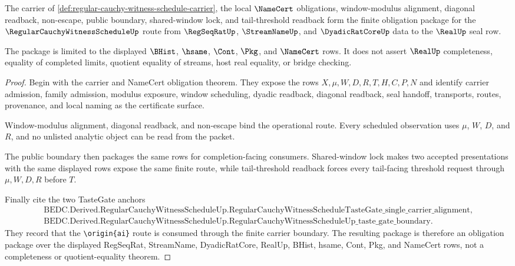 \begin{theorem}
\label{thm:regular-cauchy-witness-schedule-real-seal-readiness}
The carrier of \autoref{def:regular-cauchy-witness-schedule-carrier}, the local $\NameCert$ obligations, window-modulus alignment, diagonal readback, non-escape, public boundary, shared-window lock, and tail-threshold readback form the finite obligation package for the $\RegularCauchyWitnessScheduleUp$ route from $\RegSeqRatUp$, $\StreamNameUp$, and $\DyadicRatCoreUp$ data to the $\RealUp$ seal row.

The package is limited to the displayed $\BHist$, $\hsame$, $\Cont$, $\Pkg$, and $\NameCert$ rows. It does not assert $\RealUp$ completeness, equality of completed limits, quotient equality of streams, host real equality, or bridge checking.
\end{theorem}
\begin{proof}
Begin with the carrier and NameCert obligation theorem. They expose the rows $X,\mu,W,D,R,T,H,C,P,N$ and identify carrier admission, family admission, modulus exposure, window scheduling, dyadic readback, diagonal readback, seal handoff, transports, routes, provenance, and local naming as the certificate surface.

Window-modulus alignment, diagonal readback, and non-escape bind the operational route. Every scheduled observation uses $\mu$, $W$, $D$, and $R$, and no unlisted analytic object can be read from the packet.

The public boundary then packages the same rows for completion-facing consumers. Shared-window lock makes two accepted presentations with the same displayed rows expose the same finite route, while tail-threshold readback forces every tail-facing threshold request through $\mu,W,D,R$ before $T$.

Finally cite the two TasteGate anchors
$$
\begin{gathered}
\text{BEDC.Derived.RegularCauchyWitnessScheduleUp.RegularCauchyWitnessScheduleTasteGate\_single\_carrier\_alignment},\\
\text{BEDC.Derived.RegularCauchyWitnessScheduleUp.RegularCauchyWitnessScheduleUp\_taste\_gate\_boundary}.
\end{gathered}
$$
They record that the \texttt{\textbackslash origin\{ai\}} route is consumed through the finite carrier boundary. The resulting package is therefore an obligation package over the displayed RegSeqRat, StreamName, DyadicRatCore, RealUp, BHist, hsame, Cont, Pkg, and NameCert rows, not a completeness or quotient-equality theorem.
\end{proof}

